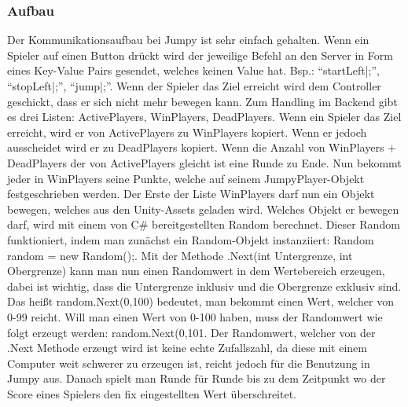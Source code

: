 \subsubsection{Aufbau}
Der Kommunikationsaufbau bei Jumpy ist sehr einfach gehalten. Wenn ein Spieler auf einen Button drückt wird der jeweilige Befehl an den Server in Form eines Key-Value Pairs gesendet, welches keinen Value hat. Bsp.: “startLeft|;”, “stopLeft|;”, “jump|;”. Wenn der Spieler das Ziel erreicht wird dem Controller geschickt, dass er sich nicht mehr bewegen kann. Zum Handling im Backend gibt es drei Listen: ActivePlayers, WinPlayers, DeadPlayers. Wenn ein Spieler das Ziel erreicht, wird er von ActivePlayers zu WinPlayers kopiert. Wenn er jedoch ausscheidet wird er zu DeadPlayers kopiert. Wenn die Anzahl von WinPlayers + DeadPlayers der von ActivePlayers gleicht ist eine Runde zu Ende. Nun bekommt jeder in WinPlayers seine Punkte, welche auf seinem JumpyPlayer-Objekt festgeschrieben werden. Der Erste der Liste WinPlayers darf nun ein Objekt bewegen, welches aus den Unity-Assets geladen wird. Welches Objekt er bewegen darf, wird mit einem von C\# bereitgestellten Random berechnet. Dieser Random funktioniert, indem man zunächst ein Random-Objekt instanziiert: Random random = new Random();. Mit der Methode .Next(int Untergrenze, int Obergrenze) kann man nun einen Randomwert in dem Wertebereich erzeugen, dabei ist wichtig, dass die Untergrenze inklusiv und die Obergrenze exklusiv sind. Das heißt random.Next(0,100) bedeutet, man bekommt einen Wert, welcher von 0-99 reicht. Will man einen Wert von 0-100 haben, muss der Randomwert wie folgt erzeugt werden: random.Next(0,101. Der Randomwert, welcher von der .Next Methode erzeugt wird ist keine echte Zufallszahl, da diese mit einem Computer weit schwerer zu erzeugen ist, reicht jedoch für die Benutzung in Jumpy aus. Danach spielt man Runde für Runde bis zu dem Zeitpunkt wo der Score eines Spielers den fix eingestellten Wert überschreitet.
